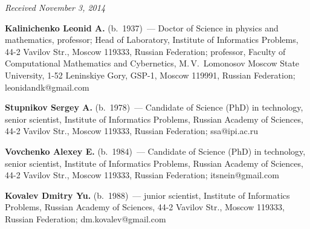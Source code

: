 \vspace*{-9pt}

\hfill{\small\textit{Received November 3, 2014}}

\vspace*{-18pt}

\Contr

\noindent
\textbf{Kalinichenko Leonid A.} (b.\ 1937)~---
 Doctor of Science in physics and mathematics, professor;
 Head of Laboratory, Institute of Informatics Problems, 44-2 Vavilov Str.,
 Moscow 119333, Russian Federation; professor,
 Faculty of Computational Mathematics and Cybernetics, M.\,V.~Lomonosov Moscow
 State University, 1-52 Leninskiye Gory, GSP-1, Moscow 119991,
 Russian Federation; leonidandk@gmail.com

 \vspace*{3pt}

 \noindent
 \textbf{Stupnikov Sergey A.} (b.\ 1978)~---
 Candidate of Science (PhD) in technology, senior scientist,
 Institute of Informatics Problems, Russian Academy of Sciences,
 44-2 Vavilov Str.,
 Moscow 119333, Russian Federation; ssa@ipi.ac.ru

 \vspace*{3pt}

 \noindent
 \textbf{Vovchenko Alexey E.} (b.\ 1984)~---
 Candidate of Science (PhD) in technology, senior scientist,
 Institute of Informatics Problems, Russian Academy of Sciences,
 44-2 Vavilov Str.,
 Moscow 119333, Russian Federation; itsnein@gmail.com

 \vspace*{3pt}

 \noindent
 \textbf{Kovalev Dmitry Yu.} (b.\ 1988)~---
 junior scientist, Institute of Informatics Problems, Russian Academy of Sciences,
 44-2 Vavilov Str.,
 Moscow 119333, Russian Federation; dm.kovalev@gmail.com







\newpage


\def\tit{КОНЦЕПТУАЛЬНОЕ МОДЕЛИРОВАНИЕ МУЛЬТИДИАЛЕКТНЫХ ПОТОКОВ РАБОТ$^*$}

\def\aut{Л.\,А.~Калиниченко$^{1,2}$, С.~Ступников$^1$, А.~Вовченко$^1$, Д.~Ковалев$^1$}


